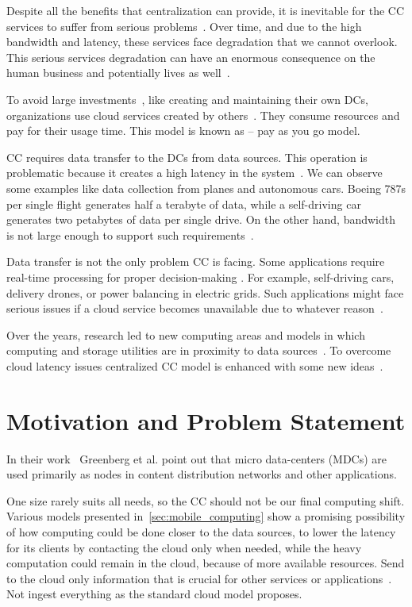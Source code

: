 Despite all the benefits that centralization can provide, it is inevitable for the CC services to suffer from serious problems~\cite{KarimIWGSYO16}. Over time, and due to the high bandwidth and latency, these services face degradation that we cannot overlook. This serious services degradation can have an enormous consequence on the human business and potentially lives as well~\cite{El-SayedSPPGML18}. 

To avoid large investments~\cite{MonsalveCC18}, like creating and maintaining their own DCs, organizations use cloud services created by others~\cite{Satyanarayanan17}. They consume resources and pay for their usage time. This model is known as -- pay as you go model.

CC requires data transfer to the DCs from data sources. This operation is problematic because it creates a high latency in the system~\cite{HossainRH18}. We can observe some examples like data collection from planes and autonomous cars. Boeing 787s per single flight generates half a terabyte of data, while a self-driving car generates two petabytes of data per single drive. On the other hand, bandwidth is not large enough to support such requirements~\cite{CaoZS18}. 

Data transfer is not the only problem CC is facing. Some applications require real-time processing for proper decision-making \cite{CaoZS18}. For example, self-driving cars, delivery drones, or power balancing in electric grids. Such applications might face serious issues if a cloud service becomes unavailable due to whatever reason~\cite{GunawiHSLSAE16}.

Over the years, research led to new computing areas and models in which computing and storage utilities are in proximity to data sources~\cite{Satyanarayanan17}. To overcome cloud latency issues centralized CC model is enhanced with some new ideas~\cite{NingLSY20}.
%
%
\section{Motivation and Problem Statement}\label{sec:problem_statement}
%
In their work~\cite{GreenbergHMP09} Greenberg et al. point out that micro data-centers (MDCs) are used primarily as nodes in content distribution networks and other  applications.

One size rarely suits all needs, so the CC should not be our final computing shift. Various models presented in~\ref{sec:mobile_computing} show a promising possibility of how computing could be done closer to the data sources, to lower the latency for its clients by contacting the cloud only when needed, while the heavy computation could remain in the cloud, because of more available resources. Send to the cloud only information that is crucial for other services or applications~\cite{inproceedingsSimic1}. Not ingest everything as the standard cloud model proposes.

